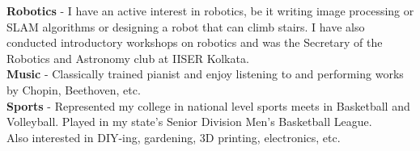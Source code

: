 \documentclass[10pt,a4paper]{article}
\begin{document}
\spacedhrule{1.6em}{-0.4em}
	  \textbf{Robotics} - I have an active interest in robotics, be it writing image processing or SLAM algorithms or designing a robot that can climb stairs. I have also conducted introductory workshops on robotics and was the Secretary of the Robotics and Astronomy club at IISER Kolkata.\\
	  \textbf{Music} - Classically trained pianist and enjoy listening to and performing works by Chopin, Beethoven, etc.\\
	  \textbf{Sports} - Represented my college in national level sports meets in Basketball and Volleyball. Played in my state's Senior Division Men's Basketball League.\\
	  Also interested in DIY-ing, gardening, 3D printing, electronics, etc.\\

\spacedhrule{1.6em}{-0.4em}
\end{document}
